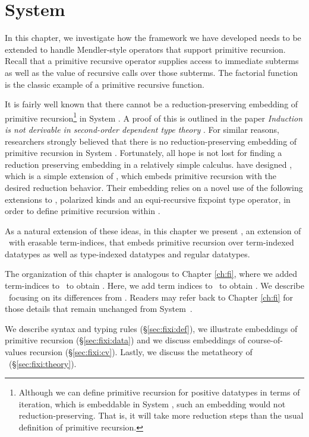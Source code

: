 \chapter{System \Fixi}\label{ch:fixi}
In this chapter, we investigate how the framework we have developed
needs to be extended to handle Mendler-style operators that support
primitive recursion. Recall that a primitive recursive operator supplies
access to immediate subterms as well as the value of recursive calls over
those subterms. The factorial function is the classic example of
a primitive recursive function.

It is fairly well known that there cannot be a reduction-preserving embedding
of primitive recursion\footnote{
	Although we can define primitive recursion for positive datatypes
	in terms of iteration, which is embeddable in System \F, such an
	embedding would not reduction-preserving. That is, it will take
	more reduction steps than the usual definition of primitive recursion.}
in System \F. A proof of this is outlined in the paper 
{\it Induction is not derivable in second-order dependent type theory}
\cite{Geuvers01}. For similar reasons, researchers strongly believed that
there is no reduction-preserving embedding of primitive recursion 
in System \Fw. Fortunately, all hope is not lost for finding
a reduction preserving embedding in a relatively simple calculus. 
\citet{AbeMat04} have designed \Fixw, which is a simple extension of \Fw,
which embeds primitive recursion with the desired reduction behavior.
Their embedding relies on a novel use of the following extensions to \Fw,
polarized kinds and an equi-recursive fixpoint type operator,
in order to define primitive recursion within \Fixw.

As a natural extension of these ideas, in this chapter we present \Fixi,
an extension of \Fixw\ with erasable term-indices, that embeds
primitive recursion over term-indexed datatypes as well as
type-indexed datatypes and regular datatypes.

The organization of this chapter is analogous to Chapter \ref{ch:fi},
where we added term-indices to \Fw\ to obtain \Fi. Here, we add
term indices to \Fixw\ to obtain \Fixi. We describe \Fixi\ focusing on
its differences from \Fi. Readers may refer back to Chapter \ref{ch:fi}
for those details that remain unchanged from System~\Fi.

We describe syntax and typing rules (\S\ref{sec:fixi:def}),
we illustrate embeddings of primitive recursion (\S\ref{sec:fixi:data})
and we discuss embeddings of course-of-values recursion (\S\ref{sec:fixi:cv}).
Lastly, we discuss the metatheory of \Fixi\ (\S\ref{sec:fixi:theory}).





